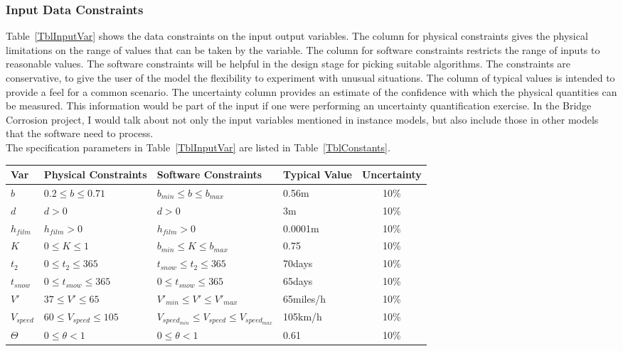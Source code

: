 \documentclass[12pt]{article}
\begin{document}
\subsubsection{Input Data Constraints} \label{sec_DataConstraints}    

Table~\ref{TblInputVar} shows the data constraints on the input output
variables.  The column for physical constraints gives the physical limitations
on the range of values that can be taken by the variable.  The column for
software constraints restricts the range of inputs to reasonable values.  The
software constraints will be helpful in the design stage for picking suitable
algorithms.  The constraints are conservative, to give the user of the model the
flexibility to experiment with unusual situations.  The column of typical values
is intended to provide a feel for a common scenario.  The uncertainty column
provides an estimate of the confidence with which the physical quantities can be
measured.  This information would be part of the input if one were performing an
uncertainty quantification exercise. In the Bridge Corrosion project, I would talk about not only the input variables mentioned in instance models, but also include those in other models that the software need to process.\\
The specification parameters in Table~\ref{TblInputVar} are listed in
Table~\ref{TblConstants}.

\begin{table}[!h]
  \caption{Input Variables} \label{TblInputVar}
  \renewcommand{\arraystretch}{1.2}
\noindent \begin{longtable*}{l l l l c} 
  \toprule
  \textbf{Var} & \textbf{Physical Constraints} & \textbf{Software Constraints} &
                             \textbf{Typical Value} & \textbf{Uncertainty}\\
  \midrule 
  $b$ & $0.2 \leq b \leq 0.71$ & $b_{min} \leq b \leq b_{max}$ & 0.56m & 10\%
  \\
  $d$ & $d > 0$ & $d>0$ & 3m & 10\%
  \\
  $h_{film}$ & $h_{film} > 0$ & $h_{film} > 0$ & 0.0001m & 10\% 
  \\
  $K$ & $0 \leq K \leq 1$ & $b_{min} \leq K \leq b_{max}$ & 0.75 & 10\%
  \\
  $t_2$ & $0 \leq t_2 \leq 365$ & $t_{snow} \leq t_2 \leq 365$ & 70days & 10\%
  \\
  $t_{snow}$ & $0 \leq t_{snow} \leq 365$ & $0 \leq t_{snow} \leq 365$ & 65days & 10\%
  \\
  $V'$ & $37 \leq V' \leq 65$ & $V'_{min}\leq V' \leq V'_{max}$ & 65miles/h & 10\%
  \\
  $V_{speed}$ & $60 \leq V_{speed} \leq 105$ & $V_{speed_{min}} \leq V_{speed} \leq V_{speed_{max}}$ & 105km/h & 10\%
  \\
  $\Theta$ & $0 \leq \theta < 1$ & $0 \leq \theta < 1$ & 0.61 & 10\%
  \\
  \bottomrule
\end{longtable*}
\end{table}
\end{document}
